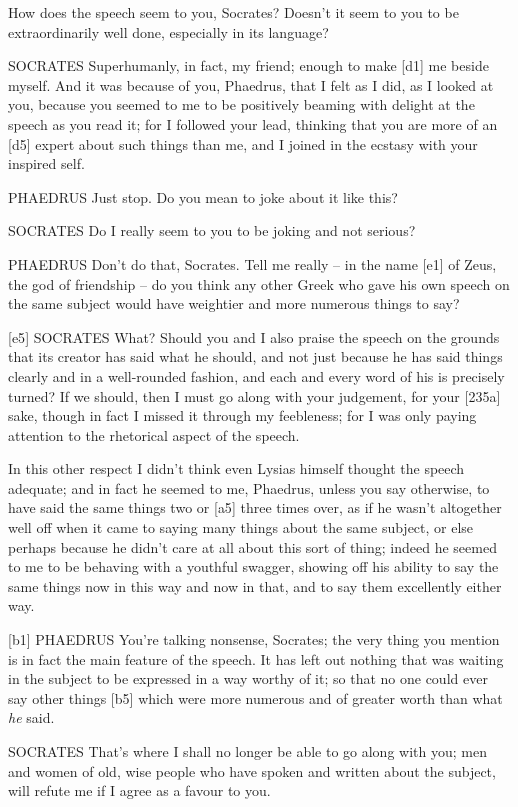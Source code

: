 How does the speech seem to you, Socrates? Doesn't it seem to you to be
extraordinarily well done, especially in its language?

SOCRATES Superhumanly, in fact, my friend; enough to make {[}d1{]} me
beside myself. And it was because of you, Phaedrus, that I felt as I
did, as I looked at you, because you seemed to me to be positively
beaming with delight at the speech as you read it; for I followed your
lead, thinking that you are more of an {[}d5{]} expert about such things
than me, and I joined in the ecstasy with your
inspired self.

PHAEDRUS Just stop. Do you mean to joke about it like this?

SOCRATES Do I really seem to you to be joking and not serious?

PHAEDRUS Don't do that, Socrates. Tell me really -- in the name {[}e1{]}
of Zeus, the god of friendship -- do you think any other Greek who gave
his own speech on the same subject would have weightier and more
numerous things to say?

{[}e5{]} SOCRATES What? Should you and I also praise the speech on the
grounds that its creator
has said what he should, and not just because he has said things clearly
and in a well-rounded fashion, and each and every word of his is
precisely turned? If we should, then I must go along with your
judgement, for your {[}235a{]} sake, though in fact I missed
it through my feebleness;
for I was only paying attention to the rhetorical aspect of the speech.

In this other respect I didn't think even Lysias himself thought the
speech adequate; and in fact he seemed to me, Phaedrus, unless you say
otherwise, to have said the same things two or {[}a5{]} three times
over, as if he wasn't altogether well off when it came to saying many
things about the same subject, or else perhaps because he didn't care at
all about this sort of thing; indeed he seemed to me to be behaving with
a youthful swagger, showing off his ability to say the same things now
in this way and now in that, and to say them excellently either way.

{[}b1{]} PHAEDRUS You're talking nonsense, Socrates; the very thing you
mention is in fact the main feature of the speech. It has left out
nothing that was waiting in the subject to be expressed in a way worthy
of it; so that no one could ever say other things {[}b5{]} which were
more numerous and of greater worth than what {\em he} said.

SOCRATES That's where I shall no longer be able to go along with you;
men and women of old, wise people who have spoken and written about the
subject, will refute me if I agree as a favour to you.

